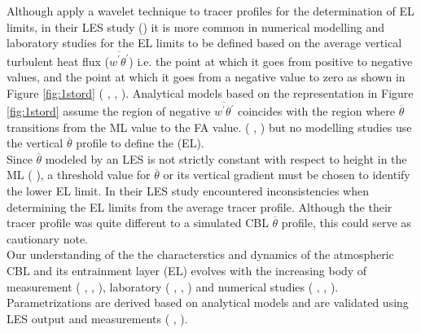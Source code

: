 Although \citeauthor{BrooksFowler2} apply a wavelet technique to tracer profiles for the determination of \acs{EL} limits, in their \acs{LES} study (\cite{BrooksFowler2}) it is more common in numerical modelling and laboratory studies for the \acs{EL} limits to be defined based on the average vertical turbulent heat flux ($\overline{w^{'}\theta^{'}}$) i.e. the point at which it goes from positive to negative values, and the point at which it goes from a negative value to zero as shown in Figure \ref{fig:1stord} (\citeauthor{DearWill80} \citeyear{DearWill80}, \citeauthor{FedConzMir04} \citeyear{FedConzMir04}, \citeauthor{GarciaMellado} \citeyear{GarciaMellado}). Analytical models based on the representation in Figure \ref{fig:1stord} assume the region of negative $\overline{w^{'}\theta^{'}}$ coincides with the region where $\overline{\theta}$ transitions from the \acs{ML} value to the \acs{FA} value. (\citeauthor{Deardorff79} \citeyear{Deardorff79},  \citeyear{FedConzMir04}) but no modelling studies use the vertical $\overline{\theta}$ profile to define the (\acs{EL}).\\

Since $\overline{\theta}$ modeled by an \acs{LES} is not strictly constant with respect to height in the \acs{ML} (\citeauthor{FedConzMir04} \citeyear{FedConzMir04}), a threshold value for $\overline{\theta}$ or its vertical gradient must be chosen to identify the lower \acs{EL} limit.  In their \citeyear{BrooksFowler2} \acs{LES} study \citeauthor{BrooksFowler2} encountered inconsistencies when determining the \acs{EL} limits from the average tracer profile.  Although the their tracer profile was quite different to a simulated \acs{CBL} $\overline{\theta}$ profile, this could serve as cautionary note.\\             

Our understanding of the the characterstics and dynamics of the atmospheric \acs{CBL} and its entrainment layer (\acs{EL}) evolves with the increasing body of measurement (\citeauthor{} \citeyear{}, \citeauthor{} \citeyear{}, \citeauthor{} \citeyear{}), laboratory (\citeauthor{} \citeyear{}, \citeauthor{} \citeyear{}, \citeauthor{} \citeyear{}) and numerical studies (\citeauthor{} \citeyear{}, \citeauthor{} \citeyear{}, \citeauthor{} \citeyear{}). Parametrizations are derived based on analytical models and are validated using \acs{LES} output and measurements (\citeauthor{} \cite{}, \citeauthor{} \cite{}).  

